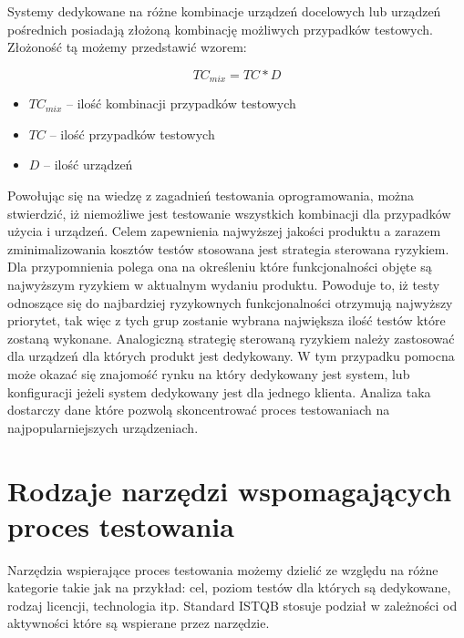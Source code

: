 Systemy dedykowane na różne kombinacje urządzeń docelowych lub urządzeń pośrednich posiadają złożoną kombinację możliwych przypadków testowych. Złożoność tą możemy przedstawić wzorem:

\begin{equation}
TC_{mix} = TC * D
\end{equation}
	\begin{itemize}
		\item $TC_{mix}$ -- ilość kombinacji przypadków testowych
		\item $TC$ -- ilość przypadków testowych
		\item $D$ -- ilość urządzeń
	\end{itemize}


Powołując się na wiedzę z zagadnień testowania oprogramowania, można stwierdzić, iż niemożliwe jest testowanie wszystkich kombinacji dla przypadków użycia i urządzeń. Celem zapewnienia najwyższej jakości produktu a zarazem zminimalizowania kosztów testów stosowana jest strategia sterowana ryzykiem. Dla przypomnienia polega ona na określeniu które funkcjonalności objęte są najwyższym ryzykiem w aktualnym wydaniu produktu. Powoduje to, iż testy odnoszące się do najbardziej ryzykownych funkcjonalności otrzymują najwyższy priorytet, tak więc z tych grup zostanie wybrana największa ilość testów które zostaną wykonane. Analogiczną strategię sterowaną ryzykiem należy zastosować dla urządzeń dla których produkt jest dedykowany. W tym przypadku pomocna może okazać się znajomość rynku na który dedykowany jest system, lub konfiguracji jeżeli system dedykowany jest dla jednego klienta. Analiza taka dostarczy dane które pozwolą skoncentrować proces testowaniach na najpopularniejszych urządzeniach. 

\section{Rodzaje narzędzi wspomagających proces testowania}
Narzędzia wspierające proces testowania możemy dzielić ze względu na różne kategorie takie jak na przykład: cel, poziom testów dla których są dedykowane, rodzaj licencji, technologia itp. Standard ISTQB stosuje podział w zależności od aktywności które są wspierane przez narzędzie. 

